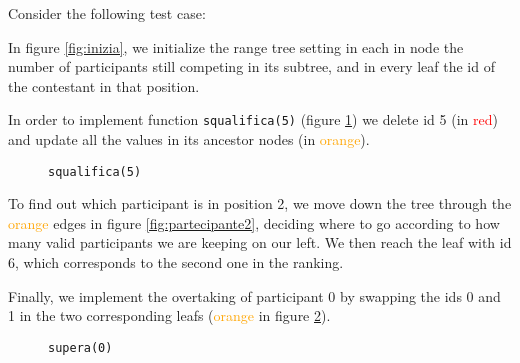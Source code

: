 Consider the following test case:
\begin{example}
\end{example}

In figure \ref{fig:inizia}, we initialize the range tree setting in each in node the number of participants still competing in its subtree, and in every leaf the id of the contestant in that position.

In order to implement function \texttt{squalifica(5)} (figure \ref{fig:squalifica5}) we delete id 5 (in \textcolor{red}{red}) and update all the values in its ancestor nodes (in \textcolor{orange}{orange}). 

\begin{figure} [htbp]
	\centering
	  \begin{minipage}{0.49\textwidth}
	
	\caption{\texttt{inizia}}%
	\label{fig:inizia}
	\end{minipage}
	\begin{minipage}{0.49\textwidth}
	
	\caption{\texttt{squalifica(5)}} %
	\label{fig:squalifica5}
	\end{minipage}
\end{figure}

\pagebreak

To find out which participant is in position 2, we move down the tree through the \textcolor{orange}{orange} edges in figure \ref{fig:partecipante2}, deciding where to go according to how many valid participants we are keeping on our left. We then reach the leaf with id 6, which corresponds to the second one in the ranking.

Finally, we implement the overtaking of participant 0 by swapping the ids 0 and 1 in the two corresponding leafs (\textcolor{orange}{orange} in figure \ref{fig:supera0}).

\begin{figure} [htbp]
	\centering
	\begin{minipage}{0.49\textwidth}
	
	\caption{\texttt{partecipante(2)}} %
	\label{fig:partecipante2}
	\end{minipage}
	\begin{minipage}{0.49\textwidth}
	
	\caption{\texttt{supera(0)}} %
	\label{fig:supera0}
	\end{minipage}
\end{figure}

\pagebreak

\CppSolution

%
\colorbox{white}{}

\afterpage{\nopagecolor}

